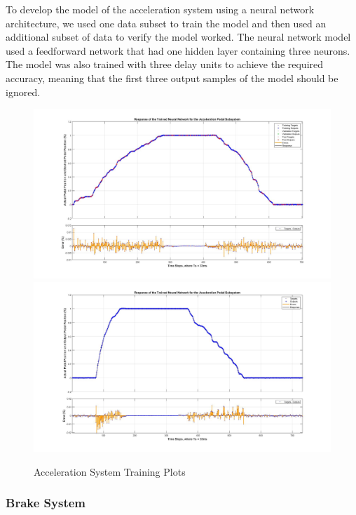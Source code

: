 \documentclass[journal,twoside,web]{ieeecolor}
\begin{document}
To develop the model of the acceleration system using a neural network architecture, we used one data subset to train the model and then used an additional subset of data to verify the model worked. The neural network model used a feedforward network that had one hidden layer containing three neurons. The model was also trained with three delay units to achieve the required accuracy, meaning that the first three output samples of the model should be ignored. 

\begin{figure}[htbp]
	\centering
		{\includegraphics[width=0.48\linewidth]{figs/img/accelNeuralNetworkTrainedOutput}}
		{\includegraphics[width=0.48\linewidth]{figs/img/accelNeuralNetworkTrainedOutput2}}
	\caption{Acceleration System Training Plots}
\end{figure}


\subsubsection{Brake System}
\end{document}
